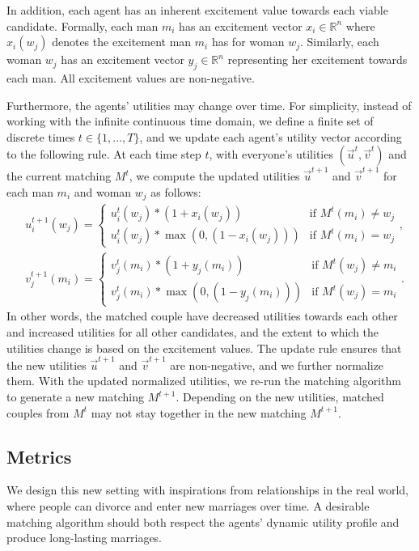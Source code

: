 In addition, each agent has an inherent excitement value towards each viable candidate. Formally, each man $m_i$ has an excitement vector $x_i \in \mathbb{R}^n$ where $x_i(w_j)$ denotes the excitement man $m_i$ has for woman $w_j$. Similarly, each woman $w_j$ has an excitement vector $y_j \in \mathbb{R}^n$ representing her excitement towards each man. All excitement values are non-negative.

Furthermore, the agents' utilities may change over time. For simplicity, instead of working with the infinite continuous time domain, we define a finite set of discrete times $t \in \{1, \ldots, T\}$, and we update each agent's utility vector according to the following rule. At each time step $t$, with everyone's utilities $(\overrightarrow{u}^{t}, \overrightarrow{v}^{t})$ and the current matching $M^t$, we compute the updated utilities $\overrightarrow{u}^{t+1}$ and $\overrightarrow{v}^{t+1}$ for each man $m_i$ and woman $w_j$ as follows:
    \begin{align*}
        & u^{t+1}_i(w_j) = \begin{cases} u^t_i(w_j) * (1 + x_i(w_j)) &\text{if $M^t(m_i) \neq w_j$} \\ u^t_i(w_j) * \max(0, (1 - x_i(w_j))) &\text{if $M^t(m_i) = w_j$} \end{cases},\\
        & v^{t+1}_j(m_i) = \begin{cases} v^t_j(m_i) * (1 + y_j(m_i)) &\text{if $M^t(w_j) \neq m_i$} \\ v^t_j(m_i) * \max(0, (1 - y_j(m_i))) &\text{if $M^t(w_j) = m_i$} \end{cases}.
    \end{align*}
In other words, the matched couple have decreased utilities towards each other and increased utilities for all other candidates, and the extent to which the utilities change is based on the excitement values. The update rule ensures that the new utilities $\overrightarrow{u}^{t+1}$ and $\overrightarrow{v}^{t+1}$ are non-negative, and we further normalize them. With the updated normalized utilities, we re-run the matching algorithm to generate a new matching $M^{t+1}$. Depending on the new utilities, matched couples from $M^t$ may not stay together in the new matching $M^{t+1}$.


\subsection{Metrics}
We design this new setting with inspirations from relationships in the real world, where people can divorce and enter new marriages over time. A desirable matching algorithm should both respect the agents' dynamic utility profile and produce long-lasting marriages.

